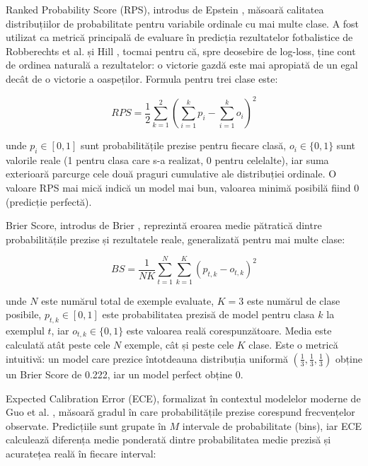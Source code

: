 Ranked Probability Score (RPS), introdus de Epstein \cite{Epstein1969},
măsoară calitatea distribuțiilor de probabilitate pentru variabile
ordinale cu mai multe clase. A fost utilizat ca metrică principală de
evaluare în predicția rezultatelor fotbalistice de Robberechts et al.
\cite{Robberechts2019} și Hill \cite{Hill2022}, tocmai pentru că, spre
deosebire de log-loss, ține cont de ordinea naturală a rezultatelor: o
victorie gazdă este mai apropiată de un egal decât de o victorie a
oaspeților. Formula pentru trei clase este:

\begin{equation}
    RPS = \frac{1}{2} \sum_{k=1}^{2}
    \left( \sum_{i=1}^{k} p_i - \sum_{i=1}^{k} o_i \right)^2
\end{equation}

unde $p_i \in [0,1]$ sunt probabilitățile prezise pentru fiecare clasă,
$o_i \in \{0, 1\}$ sunt valorile reale (1 pentru clasa care s-a realizat,
0 pentru celelalte), iar suma exterioară parcurge cele două praguri
cumulative ale distribuției ordinale. O valoare RPS mai mică indică un
model mai bun, valoarea minimă posibilă fiind 0 (predicție perfectă).

Brier Score, introdus de Brier \cite{Brier1950}, reprezintă eroarea medie
pătratică dintre probabilitățile prezise și rezultatele reale,
generalizată pentru mai multe clase:

\begin{equation}
    BS = \frac{1}{N K} \sum_{t=1}^{N} \sum_{k=1}^{K}
    \left( p_{t,k} - o_{t,k} \right)^2
\end{equation}

unde $N$ este numărul total de exemple evaluate, $K = 3$ este numărul de
clase posibile, $p_{t,k} \in [0,1]$ este probabilitatea prezisă de model
pentru clasa $k$ la exemplul $t$, iar $o_{t,k} \in \{0,1\}$ este valoarea
reală corespunzătoare. Media este calculată atât peste cele $N$ exemple,
cât și peste cele $K$ clase. Este o metrică intuitivă: un model care
prezice întotdeauna distribuția uniformă
$(\frac{1}{3}, \frac{1}{3}, \frac{1}{3})$ obține un Brier Score de 0.222,
iar un model perfect obține 0.

Expected Calibration Error (ECE), formalizat în contextul modelelor moderne
de Guo et al. \cite{Guo2017}, măsoară gradul în care probabilitățile
prezise corespund frecvențelor observate. Predicțiile sunt grupate în $M$
intervale de probabilitate (bins), iar ECE calculează diferența medie
ponderată dintre probabilitatea medie prezisă și acuratețea reală în
fiecare interval:

